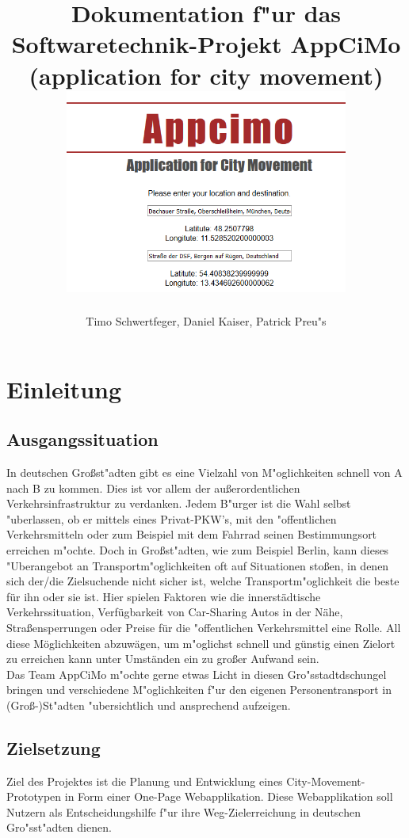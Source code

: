 \documentclass[a4paper, 11pt]{scrreprt}
\author{Timo Schwertfeger, Daniel Kaiser, Patrick Preu"s}
\title{Dokumentation f"ur das Softwaretechnik-Projekt AppCiMo (application for city movement) 
\newline
\newline
\includegraphics[width=0.7\textwidth]{appcimo.png}}
\begin{document}
\maketitle

\setcounter{secnumdepth}{5}
\setcounter{tocdepth}{5}

\tableofcontents


\chapter{Einleitung}





\section{Ausgangssituation}
In deutschen Großst"adten gibt es eine Vielzahl von M"oglichkeiten schnell von A nach B zu kommen. Dies ist vor allem der außerordentlichen Verkehrsinfrastruktur zu verdanken. Jedem B"urger ist die Wahl selbst "uberlassen, ob er mittels eines Privat-PKW’s, mit den "offentlichen Verkehrsmitteln oder zum Beispiel mit dem Fahrrad seinen Bestimmungsort erreichen m"ochte. Doch in Großst"adten, wie zum Beispiel Berlin, kann dieses "Uberangebot an Transportm"oglichkeiten oft auf Situationen stoßen, in denen sich der/die Zielsuchende nicht sicher ist, welche Transportm"oglichkeit die beste für ihn oder sie ist. Hier spielen Faktoren wie die innerstädtische Verkehrssituation, Verfügbarkeit von Car-Sharing Autos in der Nähe, Straßensperrungen oder Preise für die "offentlichen Verkehrsmittel eine Rolle. All diese Möglichkeiten abzuwägen, um m"oglichst schnell und günstig einen Zielort zu erreichen kann unter Umständen ein zu großer Aufwand sein. \\

Das Team AppCiMo m"ochte gerne etwas Licht in diesen Gro"sstadtdschungel bringen und verschiedene M"oglichkeiten f"ur den eigenen Personentransport in (Groß-)St"adten "ubersichtlich und ansprechend aufzeigen.



\section{Zielsetzung}
Ziel des Projektes ist die Planung und Entwicklung eines City-Movement-Prototypen in Form einer One-Page Webapplikation. Diese Webapplikation soll Nutzern als Entscheidungshilfe f"ur ihre Weg-Zielerreichung in deutschen Gro"sst"adten dienen. \\
\end{document}
